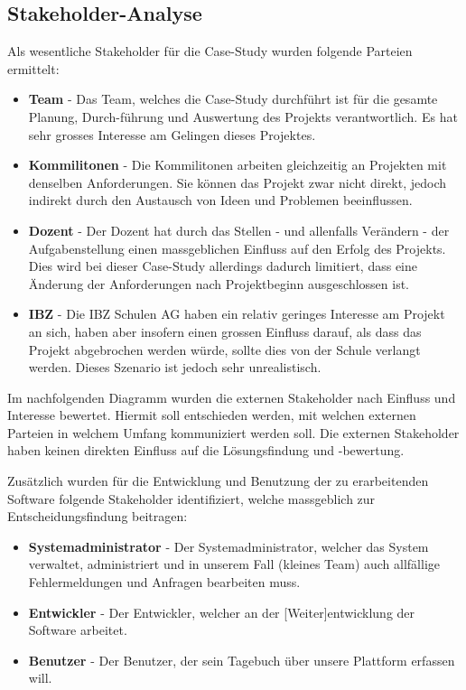 \subsection{Stakeholder-Analyse}
Als wesentliche Stakeholder für die Case-Study wurden folgende Parteien ermittelt:

\begin{itemize}
  \item \textbf{Team} - Das Team, welches die Case-Study durchführt ist für die gesamte Planung, Durch-führung und Auswertung des Projekts verantwortlich. Es hat sehr grosses Interesse am Gelingen dieses Projektes.
  \item \textbf{Kommilitonen} - Die Kommilitonen arbeiten gleichzeitig an Projekten mit denselben Anforderungen. Sie können das Projekt zwar nicht direkt, jedoch indirekt durch den Austausch von Ideen und Problemen beeinflussen.
  \item \textbf{Dozent} - Der Dozent hat durch das Stellen - und allenfalls Verändern - der Aufgabenstellung einen massgeblichen Einfluss auf den Erfolg des Projekts. Dies wird bei dieser Case-Study allerdings dadurch limitiert, dass eine Änderung der Anforderungen nach Projektbeginn ausgeschlossen ist.
  \item \textbf{IBZ} - Die IBZ Schulen AG haben ein relativ geringes Interesse am Projekt an sich, haben aber insofern einen grossen Einfluss darauf, als dass das Projekt abgebrochen werden würde, sollte dies von der Schule verlangt werden. Dieses Szenario ist jedoch sehr unrealistisch.
\end{itemize}

\noindent
Im nachfolgenden Diagramm wurden die externen Stakeholder nach Einfluss und Interesse bewertet. Hiermit soll entschieden werden, mit welchen externen Parteien in welchem Umfang kommuniziert werden soll. Die externen Stakeholder haben keinen direkten Einfluss auf die Lösungsfindung und -bewertung.
\vspace{5mm}


\noindent
Zusätzlich wurden für die Entwicklung und Benutzung der zu erarbeitenden Software folgende Stakeholder identifiziert, welche massgeblich zur Entscheidungsfindung beitragen:
\begin{itemize}
  \item \textbf{Systemadministrator} - Der Systemadministrator, welcher das System verwaltet, administriert und in unserem Fall (kleines Team) auch allfällige Fehlermeldungen und Anfragen bearbeiten muss.
  \item \textbf{Entwickler} - Der Entwickler, welcher an der [Weiter]entwicklung der Software arbeitet.
  \item \textbf{Benutzer} - Der Benutzer, der sein Tagebuch über unsere Plattform erfassen will.
\end{itemize}
